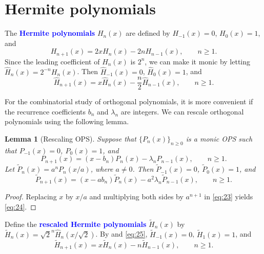 \documentclass[oneside]{book}
\numberwithin{equation}{section}
\newtheorem{lem}[thm]{Lemma}
\theoremstyle{definition}
\renewcommand\emph[1]{\textcolor{blue}{\bf #1}}
\begin{document}
\section{Hermite polynomials}

The \emph{Hermite polynomials} \( H_n(x) \) are defined by
\( H_{-1}(x) = 0 \), \( H_{0}(x) = 1 \), and
\[
  H_{n+1}(x) = 2x H_n(x) - 2n H_{n-1}(x), \qquad  n\ge1.
\]
Since the leading coefficient of \( H_n(x) \) is \( 2^n \), we can
make it monic by letting \( \hat{H}_n(x) = 2^{-n}H_n(x) \). Then
\( \hat{H}_{-1}(x) = 0 \), \( \hat{H}_{0}(x) = 1 \), and
\begin{equation}\label{eq:25}
  \hat{H}_{n+1}(x) = x \hat{H}_n(x) - \frac{n}{2} \hat{H}_{n-1}(x), \qquad  n\ge1.
\end{equation}

For the combinatorial study of orthogonal polynomials, it is more
convenient if the recurrence coefficients \( b_n \) and
\( \lambda_n \) are integers. We can rescale orthogonal polynomials
using the following lemma.

\begin{lem}[Rescaling OPS] \label{lem:rescaling} 
  Suppose that \( \{ P_n(x) \}_{n\ge 0} \) is a monic OPS such that
  \( P_{-1}(x) = 0 \), \( P_{0}(x) = 1 \), and
  \begin{equation}\label{eq:23}
      P_{n+1}(x) = (x-b_n) P_n(x) - \lambda_n P_{n-1}(x), \qquad n\ge1.
  \end{equation}
  Let \( \widetilde{P}_n(x) = a^n P_n(x/a) \), where \( a\ne0 \). Then
  \( \widetilde{P}_{-1}(x) = 0 \), \( \widetilde{P}_{0}(x) = 1 \), and
  \begin{equation}\label{eq:24}
    \widetilde{P}_{n+1}(x) = (x-ab_n) \widetilde{P}_n(x) - a^2\lambda_n
    \widetilde{P}_{n-1}(x), \qquad n\ge1.
  \end{equation}
\end{lem}
\begin{proof}
  Replacing \( x \) by \( x/a \) and multiplying both sides by
  \( a^{n+1} \) in \eqref{eq:23} yields \eqref{eq:24}.
\end{proof}

Define the \emph{rescaled Hermite polynomials}
\( \widetilde{H}_n(x) \) by
\( \widetilde{H}_n(x) = \sqrt{2}^n \hat{H}_n(x/\sqrt{2}) \). By
 and \eqref{eq:25},
\( \widetilde{H}_{-1}(x) = 0 \), \( \widetilde{H}_1(x) = 1 \), and 
\begin{equation}\label{eq:hermite-3rr}
  \widetilde{H}_{n+1}(x) = x \widetilde{H}_n(x) - n
  \widetilde{H}_{n-1}(x), \qquad n\ge1.
\end{equation}
\end{document}
